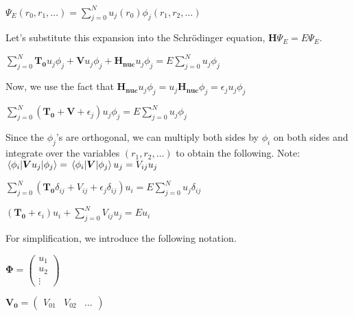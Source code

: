 \documentclass[12pt,letterpaper]{article}
\numberwithin{equation}{section}
\begin{document}
\begin{center}
$\Psi_E(r_0,r_1,\dots) = \sum_{j=0}^{N} u_j(r_0)\phi_j(r_1,r_2,\dots)$
\end{center}

\noindent Let's substitute this expansion into the Schrödinger equation, $\boldsymbol{H} \Psi_E = E \Psi_E$. 

\begin{center}
$\sum_{j=0}^{N} \boldsymbol{T_0}u_j\phi_j + \boldsymbol{V}u_j\phi_j + \boldsymbol{H_{nuc}}u_j\phi_j = E \sum_{j=0}^{N} u_j\phi_j$
\end{center}

\noindent Now, we use the fact that $\boldsymbol{H_{nuc}}u_j\phi_j = u_j\boldsymbol{H_{nuc}}\phi_j = \epsilon_j u_j\phi_j$

\begin{center}
$\sum_{j=0}^{N} (\boldsymbol{T_0} + \boldsymbol{V} + \epsilon_j) u_j\phi_j = E \sum_{j=0}^{N} u_j\phi_j$
\end{center}

\noindent Since the $\phi_j$'s are orthogonal, we can multiply both sides by $\phi_i$ on both sides and integrate over the variables $(r_1,r_2,\dots)$ to obtain the following.
\newline
Note: $\matrixel{\phi_i}{\boldsymbol{V}u_j}{\phi_j} = \matrixel{\phi_i}{\boldsymbol{V}}{\phi_j}u_j = V_{ij}u_j$ 

\begin{center}
$\sum_{j=0}^{N}(\boldsymbol{T_0}\delta_{ij} + V_{ij} + \epsilon_j\delta_{ij}) u_i = E \sum_{j=0}^{N}u_j\delta_{ij}$
\end{center}
\begin{center}
$(\boldsymbol{T_0} + \epsilon_i) u_i +  \sum_{j=0}^{N}V_{ij}u_j = E u_i$
\end{center}

\noindent For simplification, we introduce the following notation.

\begin{center}
$\boldsymbol{\Phi} =
\begin{pmatrix}
u_1 \\ u_2 \\ \vdots
\end{pmatrix}$
\end{center}

\begin{center}
$\boldsymbol{V_0} =
\begin{pmatrix}
V_{01} & V_{02} & \dots
\end{pmatrix}$
\end{center}
\end{document}
